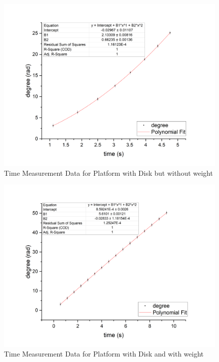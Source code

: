 \documentclass[12pt,a4paper]{article}
\begin{document}
\begin{figure}[h]
    \centering
    \includegraphics[width=12cm]{diskw.png}
    \caption{Time Measurement Data for Platform with Disk but without weight}
\end{figure}

\begin{figure}[h]
    \centering
    \includegraphics[width=12cm]{diskwo.png}
    \caption{Time Measurement Data for Platform with Disk and with weight}
\end{figure}
\end{document}
